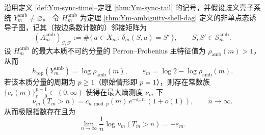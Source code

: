 \begin{theorem}\label{thm:Ym-sync-tail-pf-sharp}
沿用定义 \ref{def:Ym-sync-time}--定理 \ref{thm:Ym-sync-tail} 的记号，并假设歧义壳子系统 \(Y_m^{\mathrm{amb}}\neq\varnothing\)。
令 \(H_m^{\mathrm{amb}}\) 为定理 \ref{thm:Ym-ambiguity-shell-dag} 定义的非单点态诱导子图，记其（按边条数计数的）邻接矩阵为
\[
(A_m^{\mathrm{amb}})_{S,S'}:=\#\{\,a\in X_m:\ \delta_m(S,a)=S'\,\},\qquad
S,S'\in\mathcal{S}_m^{\mathrm{amb}}.
\]
设 \(H_m^{\mathrm{amb}}\) 的最大本质不可约分量的 Perron--Frobenius 主特征值为 \(\rho_{\mathrm{amb}}(m)>1\)，从而
\[
h_{\mathrm{top}}(Y_m^{\mathrm{amb}})=\log\rho_{\mathrm{amb}}(m),
\qquad
\varepsilon_m=\log 2-\log\rho_{\mathrm{amb}}(m).
\]
若该本质分量的周期为 \(p\ge 1\)（原始情形即 \(p=1\)），则存在常数族
\(\{c_r(m)\}_{r=0}^{p-1}\subset(0,\infty)\)
使得在最大熵测度 \(\nu_m\) 下
\[
\nu_m(T_m>n)=c_{n\bmod p}(m)\,e^{-\varepsilon_m n}\,(1+o(1)),
\qquad n\to\infty.
\]
从而极限指数存在且为
\[
\lim_{n\to\infty}\frac{1}{n}\log \nu_m(T_m>n)=-\varepsilon_m.
\]
\end{theorem}

